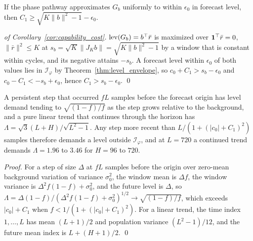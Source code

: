 {\begin{corollary}
\label{cor:capability_cost}
If the phase pathway approximates $G_b$ uniformly to within $\epsilon_0$ in forecast level, then $C_1\ge\sqrt{K\|b\|^2-1}-\epsilon_0$.
\end{corollary}

\begin{proof}[of Corollary~\ref{cor:capability_cost}]
$\operatorname{lev}(G_b)=b^\top\bar r$ is maximized over $\mathbf 1^\top\bar r=0$, $\|\bar r\|^2\le K$ at $s_b=\sqrt K\|J_Kb\|=\sqrt{K\|b\|^2-1}$ by a window that is constant within cycles, and its negative attains $-s_b$. A forecast level within $\epsilon_0$ of both values lies in $\mathcal I_\varphi$ by Theorem~\ref{thm:level_envelope}, so $c_0+C_1>s_b-\epsilon_0$ and $c_0-C_1<-s_b+\epsilon_0$, hence $C_1>s_b-\epsilon_0$. \qed
\end{proof}

\begin{corollary}
\label{cor:steps}
A persistent step that occurred $fL$ samples before the forecast origin has level demand tending to $\sqrt{(1-f)/f}$ as the step grows relative to the background, and a pure linear trend that continues through the horizon has $\Lambda=\sqrt3(L+H)/\sqrt{L^2-1}$. Any step more recent than $L/(1+(|c_0|+C_1)^2)$ samples therefore demands a level outside $\mathcal I_\varphi$, and at $L=720$ a continued trend demands $\Lambda=1.96$ to $3.46$ for $H=96$ to $720$.
\end{corollary}

\begin{proof}
For a step of size $\Delta$ at $fL$ samples before the origin over zero-mean background variation of variance $\sigma_0^2$, the window mean is $\Delta f$, the window variance is $\Delta^2f(1-f)+\sigma_0^2$, and the future level is $\Delta$, so $\Lambda=\Delta(1-f)/(\Delta^2f(1-f)+\sigma_0^2)^{1/2}\to\sqrt{(1-f)/f}$, which exceeds $|c_0|+C_1$ when $f<1/(1+(|c_0|+C_1)^2)$. For a linear trend, the time index $1,\dots,L$ has mean $(L+1)/2$ and population variance $(L^2-1)/12$, and the future mean index is $L+(H+1)/2$. \qed
\end{proof}

}
